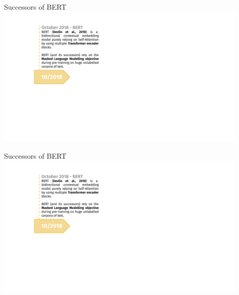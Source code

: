 \begin{vbframe}{Successors of BERT}
\hbox{\hspace{-3em} \includegraphics[width=12cm,page=4]{figure/transfer_learning_timeline4_nlp.pdf}}
\end{vbframe}
\begin{vbframe}{Successors of BERT}
\hbox{\hspace{-3em} \includegraphics[width=12cm,page=5]{figure/transfer_learning_timeline4_nlp.pdf}}
\end{vbframe}


\endlecture

